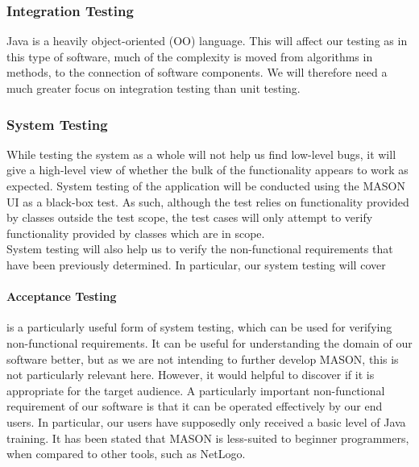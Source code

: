 \documentclass[11pt]{article}
\begin{document}
\subsubsection{Integration Testing}

Java is a heavily object-oriented (OO) language. This will affect our testing as in this type of software, much of the complexity is moved from algorithms in methods, to the connection of software components\cite[pp.236]{introduction_book}. We will therefore need a much greater focus on integration testing than unit testing.




\subsubsection{System Testing}
While testing the system as a whole will not help us find low-level bugs, it will give a high-level view of whether the bulk of the functionality appears to work as expected.
System testing of the application will be conducted using the MASON UI as a black-box test. As such, although the test relies on functionality provided by classes outside the test scope, the test cases will only attempt to verify functionality provided by classes which are in scope.
\\

System testing will also help us to verify the non-functional requirements that have been previously determined.
In particular, our system testing will cover

\paragraph{Acceptance Testing}
is a particularly useful form of system testing, which can be used for verifying non-functional requirements.
It can be useful for understanding the domain of our software better, but as we are not intending to further develop MASON, this is not particularly relevant here.
However, it would helpful to discover if it is appropriate for the target audience.
A particularly important non-functional requirement of our software is that it can be operated effectively by our end users.
In particular, our users have supposedly only received a basic level of Java training.
It has been stated that MASON is less-suited to beginner programmers, when compared to other tools, such as NetLogo\cite{abm_platforms_review}.
\\
\end{document}
